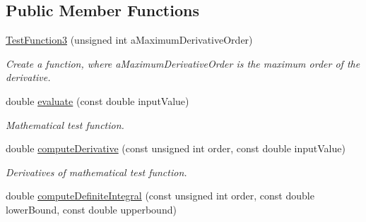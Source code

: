 \subsection*{Public Member Functions}
\begin{DoxyCompactItemize}
\item 
\hyperlink{structtudat_1_1unit__tests_1_1TestFunction3_a7afde959d15860ca904415579dd766b1}{Test\+Function3} (unsigned int a\+Maximum\+Derivative\+Order)\hypertarget{structtudat_1_1unit__tests_1_1TestFunction3_a7afde959d15860ca904415579dd766b1}{}\label{structtudat_1_1unit__tests_1_1TestFunction3_a7afde959d15860ca904415579dd766b1}

\begin{DoxyCompactList}\small\item\em Create a function, where a\+Maximum\+Derivative\+Order is the maximum order of the derivative. \end{DoxyCompactList}\item 
double \hyperlink{structtudat_1_1unit__tests_1_1TestFunction3_a4ffdf6e236017692b9ee4b9fcf9d3f00}{evaluate} (const double input\+Value)\hypertarget{structtudat_1_1unit__tests_1_1TestFunction3_a4ffdf6e236017692b9ee4b9fcf9d3f00}{}\label{structtudat_1_1unit__tests_1_1TestFunction3_a4ffdf6e236017692b9ee4b9fcf9d3f00}

\begin{DoxyCompactList}\small\item\em Mathematical test function. \end{DoxyCompactList}\item 
double \hyperlink{structtudat_1_1unit__tests_1_1TestFunction3_ad2d7f08fa955641521a436cc280252cc}{compute\+Derivative} (const unsigned int order, const double input\+Value)\hypertarget{structtudat_1_1unit__tests_1_1TestFunction3_ad2d7f08fa955641521a436cc280252cc}{}\label{structtudat_1_1unit__tests_1_1TestFunction3_ad2d7f08fa955641521a436cc280252cc}

\begin{DoxyCompactList}\small\item\em Derivatives of mathematical test function. \end{DoxyCompactList}\item 
double \hyperlink{structtudat_1_1unit__tests_1_1TestFunction3_a449b1eaeb3acc3fae0f584cb55f0452b}{compute\+Definite\+Integral} (const unsigned int order, const double lower\+Bound, const double upperbound)\hypertarget{structtudat_1_1unit__tests_1_1TestFunction3_a449b1eaeb3acc3fae0f584cb55f0452b}{}\label{structtudat_1_1unit__tests_1_1TestFunction3_a449b1eaeb3acc3fae0f584cb55f0452b}


\end{DoxyCompactItemize}
